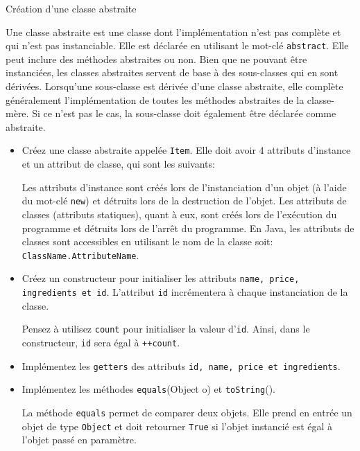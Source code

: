 \begin{Exercice}[15 minutes]{Création d'une classe abstraite}

	Une classe abstraite est une classe dont l'implémentation n'est pas complète et qui n'est pas instanciable. Elle est déclarée en utilisant le mot-clé \lstinline{abstract}. Elle peut inclure des méthodes abstraites ou non. Bien que ne pouvant être instanciées, les classes abstraites servent de base à des sous-classes qui en sont dérivées.
	Lorsqu'une sous-classe est dérivée d'une classe abstraite, elle complète généralement l'implémentation de toutes les méthodes abstraites de la classe-mère. Si ce n'est pas le cas, la sous-classe doit également être déclarée comme abstraite.
	
	 
	
	\begin{itemize}
		\item Créez une classe abstraite appelée \lstinline{Item}. Elle doit avoir 4 attributs d'instance et un attribut de classe, qui sont les suivants:
		 
		\begin{conseil}
			Les attributs d'instance sont créés lors de l'instanciation d'un objet (à l'aide du mot-clé \lstinline{new}) et détruits lors de la destruction de l'objet. Les attributs de classes (attributs statiques), quant à eux, sont créés lors de l'exécution du programme et détruits lors de l'arrêt du programme. En Java, les attributs de classes sont accessibles en utilisant le nom de la classe soit: \lstinline{ClassName.AttributeName}.
		\end{conseil}
		\item Créez un constructeur pour initialiser les attributs \lstinline{name, price, ingredients et id}. L'attribut \lstinline{id} incrémentera à chaque instanciation de la classe.
		\begin{conseil}
			Pensez à utilisez \lstinline{count} pour initialiser la valeur d'\lstinline{id}. Ainsi, dans le constructeur, \lstinline{id} sera égal à \lstinline{++count}.
		\end{conseil}
		\item Implémentez les \lstinline{getters} des attributs \lstinline{id, name, price et ingredients}.
		\item Implémentez les méthodes \lstinline{equals}(Object o) et \lstinline{toString}().
	
	\begin{conseil}
	La méthode \lstinline{equals} permet de comparer deux objets. Elle prend en entrée un objet de type \lstinline{Object} et doit retourner \lstinline{True} si l'objet instancié est égal à l'objet passé en paramètre.
	\end{conseil}
\end{itemize}
		\begin{solution}  
			 
		\end{solution}
	\end{Exercice}
	
